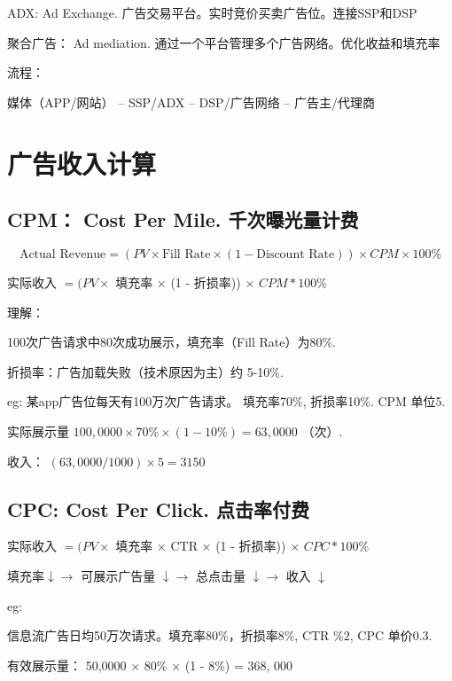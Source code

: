 \documentclass{article}
\begin{document}
ADX: Ad Exchange. 广告交易平台。实时竞价买卖广告位。连接SSP和DSP

聚合广告： Ad mediation. 通过一个平台管理多个广告网络。优化收益和填充率
 
流程：

媒体（APP/网站） -- SSP/ADX -- DSP/广告网络 -- 广告主/代理商


\section{广告收入计算}

\subsection{CPM： Cost Per Mile. 千次曝光量计费}


\begin{equation}
        \text{Actual Revenue} 
    = ( PV \times \text{Fill Rate} \times (1 - \text{Discount Rate})) 
      \times CPM \times 100\%
    \label{eq:CPM}
\end{equation}

 实际收入 $= (PV \times$ 填充率 $\times$ (1 - 折损率)) $\times$ $CPM * 100\% $

 理解： 
 
 100次广告请求中80次成功展示，填充率（Fill  Rate）为80\%.
 
 折损率：广告加载失败（技术原因为主）约 5-10\%.
 
 eg: 某app广告位每天有100万次广告请求。 填充率70\%, 折损率10\%. CPM 单位5.

 实际展示量 $100,0000 \times 70\% \times (1 - 10\%) = 63,0000$ （次）.

 收入： $ (63,0000 / 1000) \times 5 = 3150$ 
 

 \subsection{CPC: Cost Per Click. 点击率付费}
 实际收入 $= (PV \times$ 填充率 $\times$ CTR $\times$ (1 - 折损率)) $\times$ $CPC * 100\% $

填充率$\downarrow \rightarrow$ 可展示广告量 $\downarrow \rightarrow$ 总点击量 $\downarrow \rightarrow$ 收入 $\downarrow$ 

eg:

信息流广告日均50万次请求。填充率$80\%$，折损率$8\%$, CTR $\%2$, CPC 单价0.3.

有效展示量： 50,0000 $\times$ $80\%$ $\times$ (1 - 8\%) = 368, 000
\end{document}
